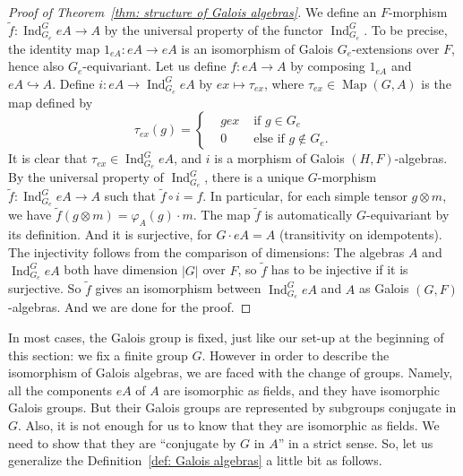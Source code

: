 \documentclass[12pt,a4paper]{amsart}
\numberwithin{equation}{section}%
\theoremstyle{plain}%
\theoremstyle{definition}%
\theoremstyle{remark}%
\begin{document}
\begin{proof}[Proof of Theorem~\ref{thm: structure of Galois algebras}]
		We define an $F$-morphism $\tilde{f}:\operatorname{Ind}^G_{G_e}eA\to A$ by the universal property of the functor $\operatorname{Ind}^G_{G_e}$.
		To be precise, the identity map $1_{eA}:eA\to eA$ is an isomorphism of Galois $G_{e}$-extensions over $F$, hence also $G_{e}$-equivariant.
		Let us define $f:eA\to A$ by composing $1_{eA}$ and $eA\hookrightarrow A$.
		Define $i:eA\to\operatorname{Ind}^G_{G_e}eA$ by $ex\mapsto\tau_{ex}$, where $\tau_{ex}\in\operatorname{Map}(G,A)$ is the map defined by
		\begin{equation*}
			\tau_{ex}(g)=\left\{\begin{aligned}
				& gex & \text{ if }g\in G_{e} \\
				& 0 & \text{ else if }g\notin G_{e}.
			\end{aligned}\right.
		\end{equation*}
		It is clear that $\tau_{ex}\in\operatorname{Ind}^{G}_{G_{e}}eA$, and $i$ is a morphism of Galois $(H,F)$-algebras.
		By the universal property of $\operatorname{Ind}^G_{G_e}$, there is a unique $G$-morphism $\tilde{f}:\operatorname{Ind}^G_{G_e}eA\to A$ such that $\tilde{f}\circ i=f$.
		In particular, for each simple tensor $g\otimes m$, we have $\tilde{f}(g\otimes m)=\varphi_A(g)\cdot m$.
		The map $\tilde{f}$ is automatically $G$-equivariant by its definition.
		And it is surjective, for $G\cdot eA=A$ (transitivity on idempotents).
		The injectivity follows from the comparison of dimensions:
		The algebras $A$ and $\operatorname{Ind}^G_{G_e}eA$ both have dimension $\lvert G\rvert$ over $F$, so $\tilde{f}$ has to be injective if it is surjective.
		So $\tilde{f}$ gives an isomorphism between $\operatorname{Ind}^G_{G_e}eA$ and $A$ as Galois $(G,F)$-algebras.
		And we are done for the proof.
	\end{proof}	
	In most cases, the Galois group is fixed, just like our set-up at the beginning of this section: we fix a finite group $G$.
	However in order to describe the isomorphism of Galois algebras, we are faced with the change of groups.
	Namely, all the components $eA$ of $A$ are isomorphic as fields, and they have isomorphic Galois groups.
	But their Galois groups are represented by subgroups conjugate in $G$.
	Also, it is not enough for us to know that they are isomorphic as fields.
	We need to show that they are ``conjugate by $G$ in $A$'' in a strict sense.
	So, let us generalize the Definition~\ref{def: Galois algebras} a little bit as follows.
\end{document}
